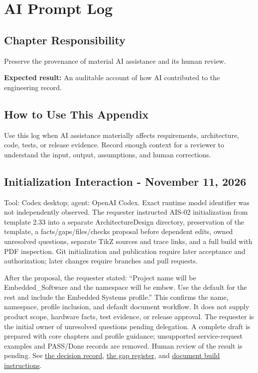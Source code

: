 \chapter{AI Prompt Log}
\section{Chapter Responsibility}
\label{Section:AIPromptLogResponsibility}
Preserve the provenance of material AI assistance and its human review.

\noindent\textbf{Expected result:} An auditable account of how AI contributed to the engineering record.

\section{How to Use This Appendix}
Use this log when AI assistance materially affects requirements, architecture, code, tests, or release evidence. Record enough context for a reviewer to understand the input, output, assumptions, and human corrections.

\section{Initialization Interaction - November 11, 2026}
\label{Section:InitializationPrompt}
Tool: Codex desktop; agent: OpenAI Codex. Exact runtime model identifier was
not independently observed. The requester instructed AIS-02 initialization
from template 2.33 into a separate ArchitectureDesign directory, preservation
of the template, a facts/gaps/files/checks proposal before dependent edits,
owned unresolved questions, separate TikZ sources and trace links, and a full
build with PDF inspection. Git initialization and publication require later
acceptance and authorization; later changes require branches and pull requests.

After the proposal, the requester stated: ``Project name will be
Embedded\_Software and the namespace will be embsw. Use the default for the rest
and include the Embedded Systems profile.'' This confirms the name, namespace,
profile inclusion, and default document workflow. It does not supply product
scope, hardware facts, test evidence, or release approval. The requester is
the initial owner of unresolved questions pending delegation. A complete draft
is prepared with core chapters and profile guidance; unsupported service-request
examples and PASS/Done records are removed. Human review of the result is pending.
See \hyperref[Section:InitializationDecisions]{the decision record},
\hyperref[Section:InitializationGaps]{the gap register}, and
\hyperref[Section:ProjectDocumentBuild]{document build instructions}.

